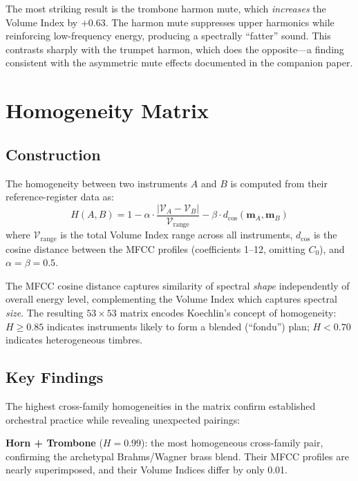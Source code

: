 \documentclass[journal]{IEEEtran}
\begin{document}
The most striking result is the trombone harmon mute, which \emph{increases} the Volume Index by $+0.63$. The harmon mute suppresses upper harmonics while reinforcing low-frequency energy, producing a spectrally ``fatter'' sound. This contrasts sharply with the trumpet harmon, which does the opposite---a finding consistent with the asymmetric mute effects documented in the companion paper.

\section{Homogeneity Matrix}
\label{sec:homogeneity}

\subsection{Construction}

The homogeneity between two instruments $A$ and $B$ is computed from their reference-register data as:
\begin{equation}
H(A, B) = 1 - \alpha \cdot \frac{|\mathcal{V}_A - \mathcal{V}_B|}{\mathcal{V}_\text{range}} - \beta \cdot d_\text{cos}(\mathbf{m}_A, \mathbf{m}_B)
\end{equation}
where $\mathcal{V}_\text{range}$ is the total Volume Index range across all instruments, $d_\text{cos}$ is the cosine distance between the MFCC profiles (coefficients 1--12, omitting $C_0$), and $\alpha = \beta = 0.5$.

The MFCC cosine distance captures similarity of spectral \emph{shape} independently of overall energy level, complementing the Volume Index which captures spectral \emph{size}. The resulting $53 \times 53$ matrix encodes Koechlin's concept of homogeneity: $H \geq 0.85$ indicates instruments likely to form a blended (``fondu'') plan; $H < 0.70$ indicates heterogeneous timbres.

\subsection{Key Findings}

The highest cross-family homogeneities in the matrix confirm established orchestral practice while revealing unexpected pairings:

\textbf{Horn + Trombone} ($H = 0.99$): the most homogeneous cross-family pair, confirming the archetypal Brahms/Wagner brass blend. Their MFCC profiles are nearly superimposed, and their Volume Indices differ by only 0.01.
\end{document}

